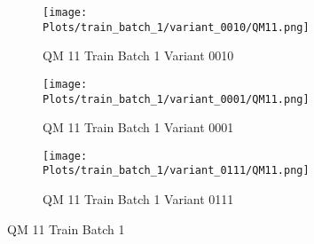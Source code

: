 \documentclass{DissertateFigs}
\begin{document}
\begin{figure}[t!]
\medskip

    \begin{subfigure}{0.47\textwidth}
    \texttt{[image: Plots/train\_batch\_1/variant\_0010/QM11.png]}
    \caption{QM 11 Train Batch 1 Variant 0010}
    \end{subfigure}
    \begin{subfigure}{0.47\textwidth}
    \texttt{[image: Plots/train\_batch\_1/variant\_0001/QM11.png]}
    \caption{QM 11 Train Batch 1 Variant 0001}
    \end{subfigure}

\medskip

    \begin{subfigure}{0.47\textwidth}
    \texttt{[image: Plots/train\_batch\_1/variant\_0111/QM11.png]}
    \caption{QM 11 Train Batch 1 Variant 0111}
    \end{subfigure}
\caption{QM 11 Train Batch 1}
    \end{figure}
\clearpage
\end{document}

